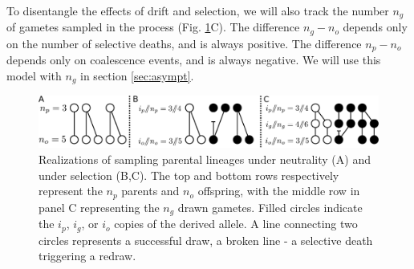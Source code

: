 \documentclass[review]{elsarticle}
\newcommand{\dslash}{/\!\!/}
\begin{document}
%

To disentangle the effects of drift and selection, we will also track the number $n_g$ of gametes sampled in the process
 (Fig. \ref{fig:schematic}C). The difference $n_g-n_o$ depends only on the number of selective deaths, and
 is always positive. The difference $n_p-n_o$ depends only on coalescence events, and is always negative.    
We will use this model with $n_g$ in section
\ref{sec:asympt}.

\begin{figure}[h]
  \centering
  \includegraphics[width=1.0\textwidth]{fig/schematic.pdf}
  \caption{\label{fig:schematic} Realizations of sampling parental lineages under neutrality (A) and
    under selection (B,C). The top and bottom rows respectively represent the $n_p$ parents and $n_o$ offspring, 
    with the middle row in panel C representing the $n_g$ drawn gametes.
    Filled circles indicate the $i_p$, $i_g$, or $i_o$ copies of the derived allele. A line connecting
    two circles represents a successful draw, a broken line - a selective death triggering a redraw.
    }
\end{figure}
\end{document}
